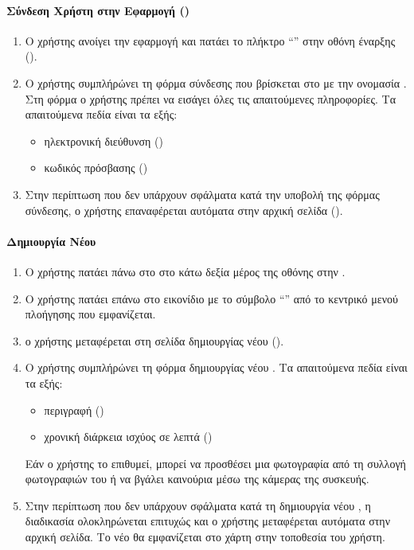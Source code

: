 \paragraph{Σύνδεση Χρήστη στην Εφαρμογή (\textit{})}
\begin{enumerate}
    \item Ο χρήστης ανοίγει την εφαρμογή και πατάει το πλήκτρο ``\textit{}'' στην οθόνη έναρξης (\textit{}).
    \item Ο χρήστης συμπλήρώνει τη φόρμα σύνδεσης που βρίσκεται στο  με την ονομασία . Στη φόρμα ο χρήστης πρέπει να εισάγει όλες τις απαιτούμενες πληροφορίες. Τα απαιτούμενα πεδία είναι τα εξής:
    \begin{itemize}
        \item ηλεκτρονική διεύθυνση (\textit{})
        \item κωδικός πρόσβασης (\textit{})
    \end{itemize}
    \item Στην περίπτωση που δεν υπάρχουν σφάλματα κατά την υποβολή της φόρμας σύνδεσης, ο χρήστης επαναφέρεται αυτόματα στην αρχική σελίδα (\textit{}).
\end{enumerate}

\paragraph{Δημιουργία Νέου }
\begin{enumerate}
    \item Ο χρήστης πατάει πάνω στο  στο κάτω δεξία μέρος της οθόνης στην .
    \item Ο χρήστης πατάει επάνω στο εικονίδιο με το σύμβολο ``\textit{}'' από το κεντρικό μενού πλοήγησης που εμφανίζεται.
    \item ο χρήστης μεταφέρεται στη σελίδα δημιουργίας νέου  (\textit{}).
    
    \item Ο χρήστης συμπλήρώνει τη φόρμα δημιουργίας νέου . Τα απαιτούμενα πεδία είναι τα εξής:
    \begin{itemize}
        \item περιγραφή (\textit{})
        \item χρονική διάρκεια ισχύος σε λεπτά (\textit{})
        
    \end{itemize}
    Εάν ο χρήστης το επιθυμεί, μπορεί να προσθέσει μια φωτογραφία από τη συλλογή φωτογραφιών του ή να βγάλει καινούρια μέσω της κάμερας της συσκευής.
    \item Στην περίπτωση που δεν υπάρχουν σφάλματα κατά τη δημιουργία νέου , η διαδικασία ολοκληρώνεται επιτυχώς και ο χρήστης μεταφέρεται αυτόματα στην αρχική σελίδα. Το νέο  θα εμφανίζεται στο χάρτη στην τοποθεσία του χρήστη.
\end{enumerate}


